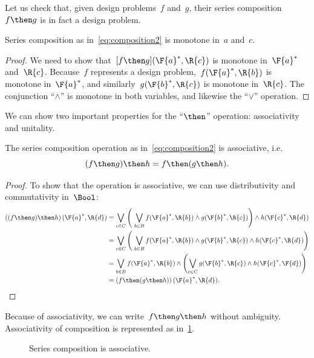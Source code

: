 Let us check that, given design problems~$f$ and~$g$, their series composition~$f\then g$ is in fact a design problem.
\begin{lemma}
    Series composition as in~\cref{eq:composition2} is monotone in~$a$ and~$c$.
\end{lemma}
\begin{proof}
 We need to show that~$[f\then g](\F{a}^*,\R{c})$ is monotone in~$\F{a}^*$ and~$\R{c}$. Because~$f$ represents a design problem,~$f(\F{a}^*,\R{b})$ is monotone in~$\F{a}^*$, and similarly~$g(\F{b}^*,\R{c})$ is monotone in~$\R{c}$. The conjunction ``$\wedge$'' is monotone in both variables, and likewise the ``$\vee$'' operation.
 \end{proof}

We can show two important properties for the ``$\then$'' operation: associativity and unitality.
\begin{lemma}
    The series composition operation as in~\cref{eq:composition2} is associative, i.e.
    \begin{equation}
        (f\then g)\then h = f\then (g\then h).
    \end{equation}
\end{lemma}

\begin{proof}
To show that the operation is associative, we can use distributivity and commutativity in~$\Bool$:
%
\begin{equation}
\begin{aligned}
\left((f\then g) \then h\right) (\F{a}^*,\R{d})
&= \bigvee_{c \in C} \left (\ \bigvee_{b\in B } f(\F{a}^*,\R{b}) \wedge g(\F{b}^*,\R{c}) \right )  \wedge  h (\F{c}^*, \R{d}) \\
&= \bigvee_{c \in C} \left (\ \bigvee_{b\in B } f(\F{a}^*,\R{b})
\wedge g(\F{b}^*,\R{c}) \wedge h (\F{c}^*, \R{d})
    \right ) \\
&= \bigvee_{b \in B } f(\F{a}^*,\R{b}) \wedge \left ( \bigvee_{c\in C} g(\F{b}^*,\R{c}) \wedge h (\F{c}^*, \F{d}) \right ) \\
&= \left(f \then (g \then h )\right) (\F{a}^*, \R{d}).
\end{aligned}
\end{equation}
%
\end{proof}

Because of associativity, we can write~$f\then g\then h$ without ambiguity.
Associativity of composition is represented as in~\cref{fig:compositionassociativity}.

\begin{figure}[h!]
\begin{center}
\end{center}
\caption{Series composition is associative. \label{fig:compositionassociativity}}
\end{figure}

